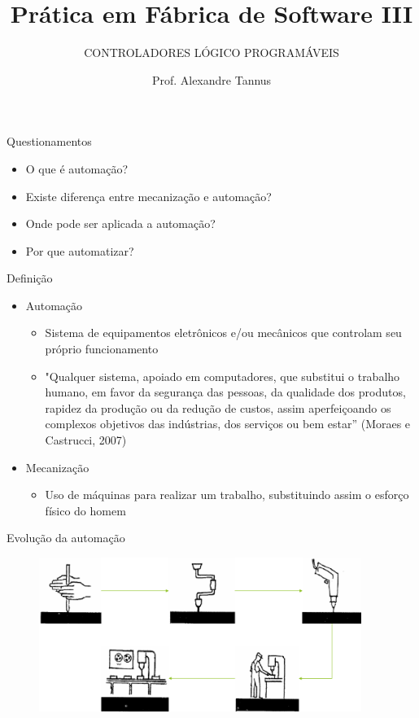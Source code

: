 \documentclass[aspectratio=169,
				xcolor=table]{beamer}
\institute[]{\uppercase{Engenharia da Computação}}
\title[]{Prática em Fábrica de Software III}
\subtitle[]{\uppercase{Controladores Lógico Programáveis}}
\author[]{Prof. Alexandre Tannus}
\date{}
\begin{document}
	\begin{frame}
		\titlepage
	\end{frame}
	
	\begin{frame}{Questionamentos}
		\begin{itemize}
			\item O que é automação?
			\vspace{1em}
			\item Existe diferença entre mecanização e automação?
			\vspace{1em}
			\item Onde pode ser aplicada a automação?
			\vspace{1em}
			\item Por que automatizar?
		\end{itemize}		
	\end{frame}
	
	\begin{frame}{Definição}
		\begin{itemize}
			\item Automação
			\begin{itemize}
				\item Sistema de equipamentos eletrônicos e/ou mecânicos que controlam seu próprio funcionamento
				\item "Qualquer sistema, apoiado em computadores, que substitui o trabalho humano, em favor da segurança das pessoas, da qualidade dos produtos, rapidez da produção ou da redução de custos, assim aperfeiçoando os complexos objetivos das indústrias, dos serviços ou bem estar” (Moraes e Castrucci, 2007)
			\end{itemize}
			\vspace{0.7em}
			\item Mecanização
			\begin{itemize}
				\item Uso de máquinas para realizar um trabalho, substituindo assim o esforço físico do homem
			\end{itemize}
		\end{itemize}
	\end{frame}
	
	\begin{frame}{Evolução da automação}
		\begin{figure}[hbtp]
		\centering
		\includegraphics[height=5cm, keepaspectratio]{../figs/cap04/automacao.png}
		\end{figure}		
	\end{frame}
	
\end{document}
